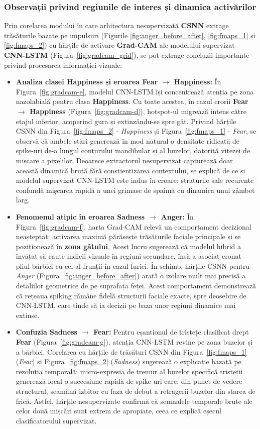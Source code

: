 \subsubsection*{Observații privind regiunile de interes și dinamica activărilor}
Prin corelarea modului în care arhitectura nesupervizată \textbf{CSNN} extrage trăsăturile bazate pe impulsuri (Figurile \ref{fig:anger_before_after}, \ref{fig:fmaps_1} și \ref{fig:fmaps_2}) cu hărțile de activare \textbf{Grad-CAM} ale modelului supervizat \textbf{CNN-LSTM} (Figura~\ref{fig:gradcam_grid}), se pot extrage concluzii importante privind procesarea informației vizuale:
\begin{itemize}
	\item \textbf{Analiza clasei Happiness și eroarea Fear $\to$ Happiness:} În Figura~\ref{fig:gradcam-e}, modelul CNN-LSTM își concentrează atenția pe zona nazolabială pentru clasa \textbf{Happiness}. Cu toate acestea, în cazul erorii \textbf{Fear $\to$ Happiness} (Figura~\ref{fig:gradcam-d}), hotspot-ul migrează intens către etajul inferior, acoperind gura și extinzându-se spre gât. Privind hărțile CSNN din Figura~\ref{fig:fmaps_2} - \textit{Happiness} și Figura~\ref{fig:fmaps_1} - \textit{Fear}, se observă că ambele stări generează în mod natural o densitate ridicată de spike-uri de-a lungul conturului mandibular și al buzelor, datorită vitezei de mișcare a pixelilor. Deoarece extractorul nesupervizat capturează doar această dinamică brută fără conștientizarea contextului, se explică de ce și modelul supervizat CNN-LSTM este indus în eroare: straturile sale recurente confundă mișcarea rapidă a unei grimase de spaimă cu dinamica unui zâmbet larg.
	\item \textbf{Fenomenul atipic în eroarea Sadness $\to$ Anger:} În Figura~\ref{fig:gradcam-f}, harta Grad-CAM relevă un comportament decizional neașteptat: activarea maximă părăsește trăsăturile faciale principale și se poziționează în \textbf{zona gâtului}. Acest lucru sugerează că modelul hibrid a învățat să caute indicii vizuale în regiuni secundare, însă a asociat eronat pliul bărbiei cu cel al frunții în cazul furiei. În schimb, hărțile CSNN pentru \textit{Anger} (Figura~\ref{fig:anger_before_after}) arată o izolare mult mai precisă a detaliilor geometrice de pe suprafața feței. Acest comportament demonstrează că rețeaua spiking rămâne fidelă structurii faciale exacte, spre deosebire de CNN-LSTM, care tinde să ia decizii pe baza unor regiuni dinamice mai extinse.
	\item \textbf{Confuzia Sadness $\to$ Fear:} Pentru eșantionul de tristețe clasificat drept \textbf{Fear} (Figura~\ref{fig:gradcam-g}), atenția CNN-LSTM revine pe zona buzelor și a bărbiei. Corelarea cu hărțile de trăsături CSNN din Figura~\ref{fig:fmaps_1} (\textit{Fear}) și Figura~\ref{fig:fmaps_2} (\textit{Sadness}) sugerează o explicație bazată pe rezoluția temporală: micro-expresia de tremur al buzelor specifică tristeții generează local o succesiune rapidă de spike-uri care, din punct de vedere structural, seamănă izbitor cu faza de debut a retragerii buzelor din starea de frică. Astfel, hărțile nesupervizate confirmă că semnalele temporale brute ale celor două mișcări sunt extrem de apropiate, ceea ce explică eșecul clasificatorului supervizat.

\end{itemize}

